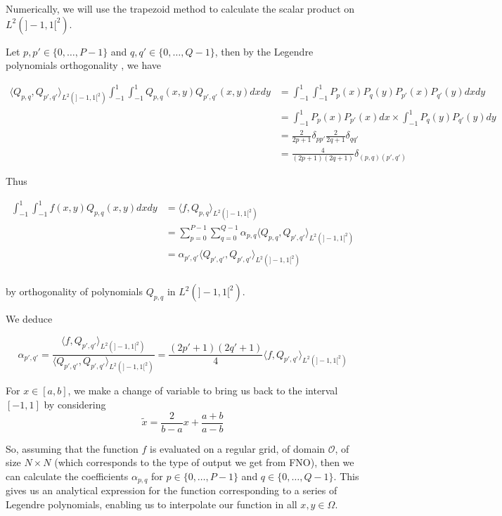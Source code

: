 \begin{Rem}
	Numerically, we will use the trapezoid method to calculate the scalar product on $L^2(]-1,1[^2)$.
\end{Rem}

Let $p,p'\in\{0,\dots,P-1\}$ and $q,q'\in\{0,\dots,Q-1\}$, then by the Legendre polynomials orthogonality , we have

\begin{align*}
	\langle Q_{p,q},Q_{p',q'}\rangle_{L^2(]-1,1[^2)}\int_{-1}^1 \int_{-1}^1 Q_{p,q}(x,y)Q_{p',q'}(x,y)dxdy&=\int_{-1}^1 \int_{-1}^1 P_p(x)P_q(y)P_{p'}(x)P_{q'}(y)dxdy \\
	&=\int_{-1}^1 P_p(x)P_{p'}(x)dx\times \int_{-1}^1 P_q(y)P_{q'}(y)dy \\
	&=\frac{2}{2p+1}\delta_{pp'}\frac{2}{2q+1}\delta_{qq'} \\
	&=\frac{4}{(2p+1)(2q+1)}\delta_{(p,q)(p',q')}
\end{align*}

\newpage

Thus

\begin{align*}
	\int_{-1}^1 \int_{-1}^1 f(x,y)Q_{p,q}(x,y)dxdy &= \langle f,Q_{p,q}\rangle_{L^2(]-1,1[^2)} \\
	&=\sum_{p=0}^{P-1}\sum_{q=0}^{Q-1}\alpha_{p,q} \langle Q_{p,q},Q_{p',q'}\rangle_{L^2(]-1,1[^2)} \\
	&=\alpha_{p',q'} \langle Q_{p',q'},Q_{p',q'}\rangle_{L^2(]-1,1[^2)} \\
\end{align*}

by orthogonality of polynomials $Q_{p,q}$ in  $L^2(]-1,1[^2)$. 

We deduce

$$\alpha_{p',q'} = \frac{\langle f,Q_{p',q'}\rangle_{L^2(]-1,1[^2)}}{\langle Q_{p',q'},Q_{p',q'}\rangle_{L^2(]-1,1[^2)}}=\frac{(2p'+1)(2q'+1)}{4}\langle f,Q_{p',q'}\rangle_{L^2(]-1,1[^2)}$$

\begin{Rem}
	For $x\in[a,b]$, we make a change of variable to bring us back to the interval $[-1,1]$ by considering
	\begin{equation*}
		\tilde{x}=\frac{2}{b-a}x+\frac{a+b}{a-b}
	\end{equation*}
\end{Rem}

So, assuming that the function $f$ is evaluated on a regular grid, of domain $\mathcal{O}$, of size $N\times N$ (which corresponds to the type of output we get from FNO), then we can calculate the coefficients $\alpha_{p,q}$ for $p\in\{0,\dots,P-1\}$ and $q\in\{0,\dots,Q-1\}$. This gives us an analytical expression for the function corresponding to a series of Legendre polynomials, enabling us to interpolate our function in all $x,y\in\Omega$.

